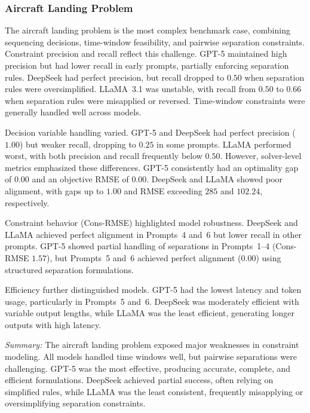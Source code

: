 \documentclass[review,12pt]{elsarticle}
\begin{document}


\subsubsection{Aircraft Landing Problem} 

The aircraft landing problem is the most complex benchmark case, combining sequencing decisions, time-window feasibility, and pairwise separation constraints. Constraint precision and recall reflect this challenge. GPT-5 maintained high precision but had lower recall in early prompts, partially enforcing separation rules. DeepSeek had perfect precision, but recall dropped to $0.50$ when separation rules were oversimplified. LLaMA~3.1 was unstable, with recall from $0.50$ to $0.66$ when separation rules were misapplied or reversed. Time-window constraints were generally handled well across models.

Decision variable handling varied. GPT-5 and DeepSeek had perfect precision ($1.00$) but weaker recall, dropping to $0.25$ in some prompts. LLaMA performed worst, with both precision and recall frequently below $0.50$. However, solver-level metrics emphasized these differences. GPT-5 consistently had an optimality gap of $0.00$ and an objective RMSE of $0.00$. DeepSeek and LLaMA showed poor alignment, with gaps up to $1.00$ and RMSE exceeding $285$ and $102.24$, respectively.

Constraint behavior (Cons-RMSE) highlighted model robustness. DeepSeek and LLaMA achieved perfect alignment in Prompts~4 and~6 but lower recall in other prompts. GPT-5 showed partial handling of separations in Prompts~1–4 (Cons-RMSE $1.57$), but Prompts~5 and~6 achieved perfect alignment ($0.00$) using structured separation formulations.

Efficiency further distinguished models. GPT-5 had the lowest latency and token usage, particularly in Prompts~5 and~6. DeepSeek was moderately efficient with variable output lengths, while LLaMA was the least efficient, generating longer outputs with high latency.

\textit{Summary:} The aircraft landing problem exposed major weaknesses in constraint modeling. All models handled time windows well, but pairwise separations were challenging. GPT-5 was the most effective, producing accurate, complete, and efficient formulations. DeepSeek achieved partial success, often relying on simplified rules, while LLaMA was the least consistent, frequently misapplying or oversimplifying separation constraints.
\end{document}
